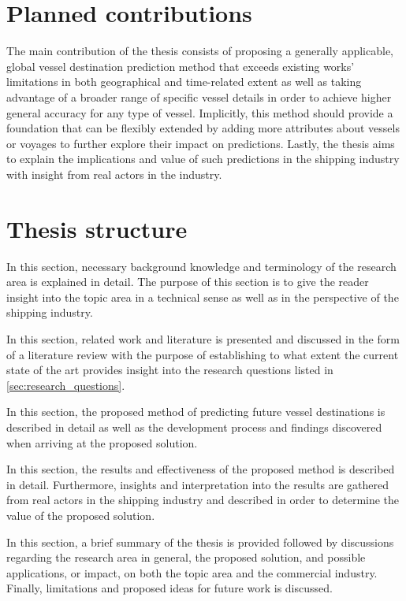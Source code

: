 \section{Planned contributions}

The main contribution of the thesis consists of proposing a generally applicable, global vessel destination prediction method that exceeds existing works' limitations in both geographical and time-related extent as well as taking advantage of a broader range of specific vessel details in order to achieve higher general accuracy for any type of vessel. Implicitly, this method should provide a foundation that can be flexibly extended by adding more attributes about vessels or voyages to further explore their impact on predictions. Lastly, the thesis aims to explain the implications and value of such predictions in the shipping industry with insight from real actors in the industry.


\section{Thesis structure}


In this section, necessary background knowledge and terminology of the research area is explained in detail. The purpose of this section is to give the reader insight into the topic area in a technical sense as well as in the perspective of the shipping industry.


In this section, related work and literature is presented and discussed in the form of a literature review with the purpose of establishing to what extent the current state of the art provides insight into the research questions listed in \cref{sec:research_questions}.


In this section, the proposed method of predicting future vessel destinations is described in detail as well as the development process and findings discovered when arriving at the proposed solution.


In this section, the results and effectiveness of the proposed method is described in detail. Furthermore, insights and interpretation into the results are gathered from real actors in the shipping industry and described in order to determine the value of the proposed solution.


In this section, a brief summary of the thesis is provided followed by discussions regarding the research area in general, the proposed solution, and possible applications, or impact, on both the topic area and the commercial industry. Finally, limitations and proposed ideas for future work is discussed.
